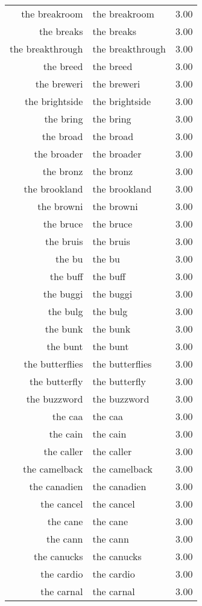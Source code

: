 \begin{table}[ht]
\begin{tabular}{rlr}
  the breakroom & the breakroom & 3.00 \\ 
  the breaks & the breaks & 3.00 \\ 
  the breakthrough & the breakthrough & 3.00 \\ 
  the breed & the breed & 3.00 \\ 
  the breweri & the breweri & 3.00 \\ 
  the brightside & the brightside & 3.00 \\ 
  the bring & the bring & 3.00 \\ 
  the broad & the broad & 3.00 \\ 
  the broader & the broader & 3.00 \\ 
  the bronz & the bronz & 3.00 \\ 
  the brookland & the brookland & 3.00 \\ 
  the browni & the browni & 3.00 \\ 
  the bruce & the bruce & 3.00 \\ 
  the bruis & the bruis & 3.00 \\ 
  the bu & the bu & 3.00 \\ 
  the buff & the buff & 3.00 \\ 
  the buggi & the buggi & 3.00 \\ 
  the bulg & the bulg & 3.00 \\ 
  the bunk & the bunk & 3.00 \\ 
  the bunt & the bunt & 3.00 \\ 
  the butterflies & the butterflies & 3.00 \\ 
  the butterfly & the butterfly & 3.00 \\ 
  the buzzword & the buzzword & 3.00 \\ 
  the caa & the caa & 3.00 \\ 
  the cain & the cain & 3.00 \\ 
  the caller & the caller & 3.00 \\ 
  the camelback & the camelback & 3.00 \\ 
  the canadien & the canadien & 3.00 \\ 
  the cancel & the cancel & 3.00 \\ 
  the cane & the cane & 3.00 \\ 
  the cann & the cann & 3.00 \\ 
  the canucks & the canucks & 3.00 \\ 
  the cardio & the cardio & 3.00 \\ 
  the carnal & the carnal & 3.00 \\ 

\end{tabular}
\end{table}
